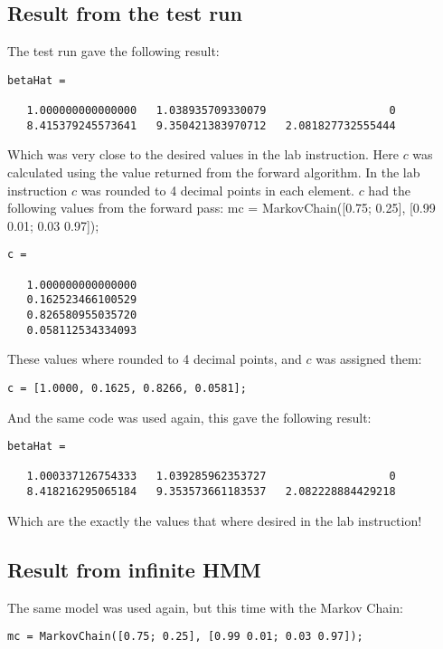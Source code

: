 \documentclass[]{article}
\begin{document}
\subsection{Result from the test run}\label{result-from-the-test-run}

The test run gave the following result:

\begin{verbatim}
betaHat =

   1.000000000000000   1.038935709330079                   0
   8.415379245573641   9.350421383970712   2.081827732555444
\end{verbatim}

Which was very close to the desired values in the lab instruction. Here
\(c\) was calculated using the value returned from the forward
algorithm. In the lab instruction \(c\) was rounded to 4 decimal points
in each element. \(c\) had the following values from the forward pass:
mc = MarkovChain({[}0.75; 0.25{]}, {[}0.99 0.01; 0.03 0.97{]});

\begin{verbatim}
c =

   1.000000000000000
   0.162523466100529
   0.826580955035720
   0.058112534334093
\end{verbatim}

These values where rounded to 4 decimal points, and \(c\) was assigned
them:

\begin{verbatim}
c = [1.0000, 0.1625, 0.8266, 0.0581];
\end{verbatim}

And the same code was used again, this gave the following result:

\begin{verbatim}
betaHat =

   1.000337126754333   1.039285962353727                   0
   8.418216295065184   9.353573661183537   2.082228884429218
\end{verbatim}

Which are the exactly the values that where desired in the lab
instruction!

\subsection{Result from infinite HMM}\label{result-from-infinite-hmm}

The same model was used again, but this time with the Markov Chain:

\begin{verbatim}
mc = MarkovChain([0.75; 0.25], [0.99 0.01; 0.03 0.97]);
\end{verbatim}
\end{document}
